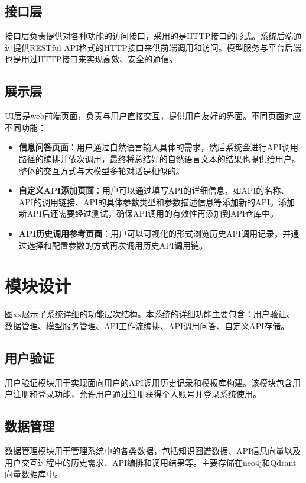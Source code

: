 \subsection{接口层}

接口层负责提供对各种功能的访问接口，采用的是HTTP接口的形式。系统后端通过提供RESTful API格式的HTTP接口来供前端调用和访问。模型服务与平台后端也是用过HTTP接口来实现高效、安全的通信。

\subsection{展示层}
UI层是web前端页面，负责与用户直接交互，提供用户友好的界面。不同页面对应不同功能：
\begin{itemize}
    \item \textbf{信息问答页面}：用户通过自然语言输入具体的需求，然后系统会进行API调用路径的编排并依次调用，最终将总结好的自然语言文本的结果也提供给用户。整体的交互方式与大模型多轮对话是相似的。
    \item \textbf{自定义API添加页面}：用户可以通过填写API的详细信息，如API的名称、API的调用链接、API的具体参数类型和参数描述信息等添加新的API。添加新API后还需要经过测试，确保API调用的有效性再添加到API仓库中。
    \item \textbf{API历史调用参考页面}：用户可以可视化的形式浏览历史API调用记录，并通过选择和配置参数的方式再次调用历史API调用链。
\end{itemize}


\section{模块设计}

图xx展示了系统详细的功能层次结构。本系统的详细功能主要包含：用户验证、数据管理、模型服务管理、API工作流编排、API调用问答、自定义API存储。

\subsection{用户验证}
用户验证模块用于实现面向用户的API调用历史记录和模板库构建。该模块包含用户注册和登录功能，允许用户通过注册获得个人账号并登录系统使用。

\subsection{数据管理}
数据管理模块用于管理系统中的各类数据，包括知识图谱数据、API信息向量以及用户交互过程中的历史需求、API编排和调用结果等。主要存储在neo4j和Qdrant向量数据库中。

